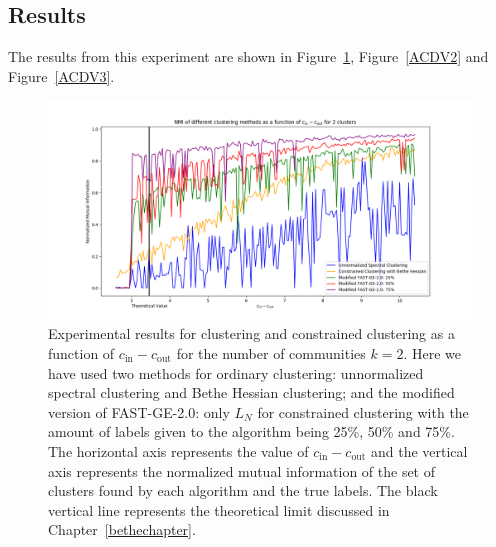 \subsection*{Results}
The results from this experiment are shown in Figure~\ref{ACDV1}, Figure~\ref{ACDV2} and Figure~\vref{ACDV3}.

\begin{figure}[h]
\begin{center}
\includegraphics[width=16cm]{figures/ACDV1.png}
\end{center}
   \caption[Experimental results for clustering and constrained clustering as a function of $c_\text{in} - c_\text{out}$ for the number of communities $k=2$]{Experimental results for clustering and constrained clustering as a function of $c_\text{in} - c_\text{out}$ for the number of communities $k=2$. Here we have used two methods for ordinary clustering: unnormalized spectral clustering and Bethe Hessian clustering; and the modified version of FAST-GE-2.0: only $L_N$ for constrained clustering with the amount of labels given to the algorithm being 25\%, 50\% and 75\%. The horizontal axis represents the value of $c_\text{in} - c_\text{out}$ and the vertical axis represents the normalized mutual information of the set of clusters found by each algorithm and the true labels. The black vertical line represents the theoretical limit discussed in Chapter~\ref{bethechapter}.}
\label{ACDV1}
\end{figure}

